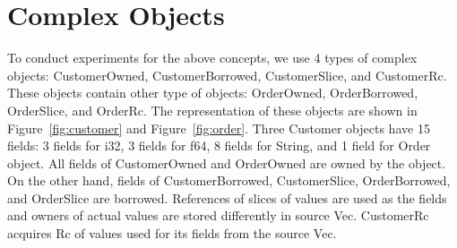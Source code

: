 \section{Complex Objects}
\label{sec:concept_compobj}
To conduct experiments for the above concepts, we use 4 types of complex objects: CustomerOwned, CustomerBorrowed, CustomerSlice, and CustomerRc. 
These objects contain other type of objects: OrderOwned, OrderBorrowed, OrderSlice, and OrderRc.
The representation of these objects are shown in Figure~\ref{fig:customer} and Figure~\ref{fig:order}. 
Three Customer objects have 15 fields: 3 fields for i32, 3 fields for f64, 8 fields for String, and 1 field for Order object.
All fields of CustomerOwned and OrderOwned are owned by the object. On the other hand, fields of CustomerBorrowed, CustomerSlice, OrderBorrowed, and OrderSlice are borrowed. 
References of slices of values are used as the fields and owners of actual values are stored differently in source Vec. 
CustomerRc acquires Rc of values used for its fields from the source Vec.

